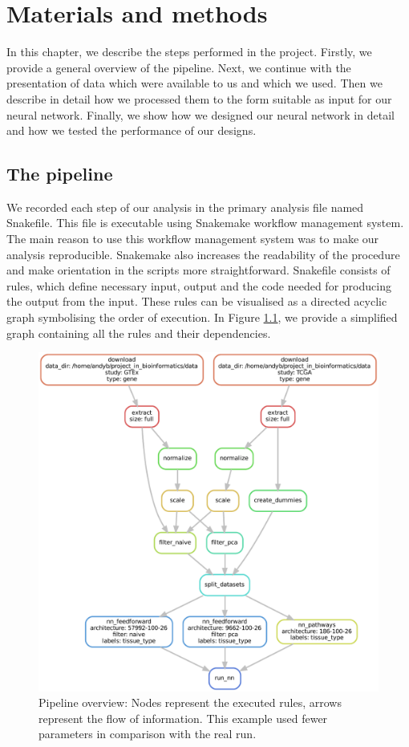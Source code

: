 \chapter{Materials and methods}
In this chapter, we describe the steps performed in the project.
Firstly, we provide a general overview of the pipeline. 
Next, we continue with the presentation of data which were available to us and which we used.
Then we describe in detail how we processed them to the form suitable as input for our neural network.
Finally, we show how we designed our neural network in detail and how we tested the performance of our designs.

\section{The pipeline}
We recorded each step of our analysis in the primary analysis file named Snakefile.
This file is executable using Snakemake workflow management system\cite{koster2012snakemake}.
The main reason to use this workflow management system was to make our analysis reproducible.
Snakemake also increases the readability of the procedure and make orientation in the scripts more straightforward.
Snakefile consists of rules, which define necessary input, output and the code needed for producing the output from the input.
These rules can be visualised as a directed acyclic graph symbolising the order of execution.
In Figure \ref{fig:dag}, we provide a simplified graph containing all the rules and their dependencies.

\begin{figure}
    \centering
    \includegraphics[width=\linewidth]{images/dag.pdf}
    \caption[Pipeline overview]{Pipeline overview: Nodes represent the executed rules, arrows represent the flow of information. This example used fewer parameters in comparison with the real run.}
    \label{fig:dag}
\end{figure}

